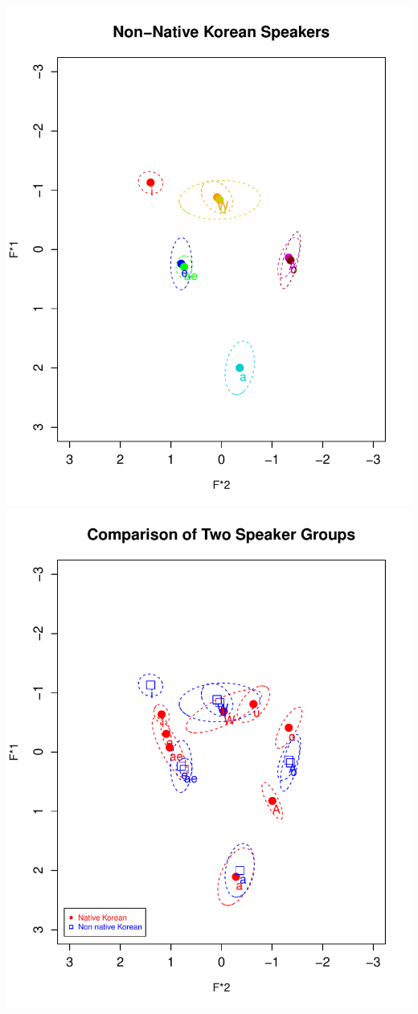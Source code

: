 \documentclass[man, fleqn, noextraspace]{apa6}
\begin{document}
\includegraphics{Group_5_Final_paper_files/figure-latex/SECTION2-5.pdf}
\includegraphics{Group_5_Final_paper_files/figure-latex/SECTION2-6.pdf}
\end{document}
